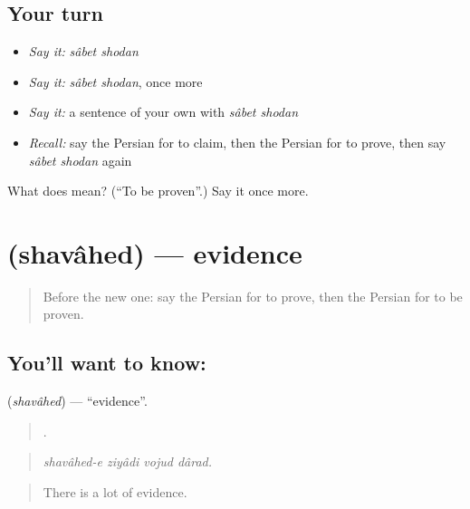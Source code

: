 \subsection*{Your turn}
\begin{itemize}
\raggedright
  \item \emph{Say it:} \emph{sâbet shodan}
  \item \emph{Say it:} \emph{sâbet shodan}, once more
  \item \emph{Say it:} a sentence of your own with \emph{sâbet shodan}
  \item \emph{Recall:} say the Persian for to claim, then the Persian for to prove, then say \emph{sâbet shodan} again
\end{itemize}

\begin{tcolorbox}[breakable,colback=teal!4,colframe=teal!35!black,title={Before you move on}]
What does   mean? (\textquotedblleft{}To be proven\textquotedblright{}.) Say it once more.
\end{tcolorbox}
\section[\texorpdfstring{\fa{شواهد} (shavâhed)}{شواهد (shavâhed)}]{ (shavâhed) — evidence}

\label{lesson:FA-C363-shavahed}



\begin{quote}
Before the new one: say the Persian for to prove, then the Persian for to be proven.
\end{quote}

\subsection*{You'll want to know: }
\textbf{} (\emph{shavâhed}) — \textquotedblleft{}evidence\textquotedblright{}.

\begin{quote}
   .
\end{quote}

\begin{quote}
\emph{shavâhed-e ziyâdi vojud dârad.}
\end{quote}

\begin{quote}
There is a lot of evidence.
\end{quote}

